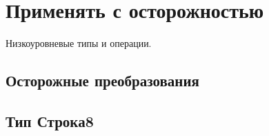 \hypertarget{unsafe}{%
\section{Применять с осторожностью}\label{unsafe:chapter}}

Низкоуровневые типы и операции.

\hypertarget{unsafe-conversions}{%
\subsection{Осторожные преобразования}\label{unsafe:conversions}}

\hypertarget{type-string8}{%
\subsection{Тип Строка8}\label{unsafe:type-string8}}


